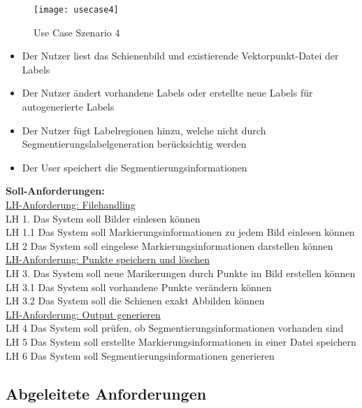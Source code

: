 \documentclass[11pt]{scrartcl}
\begin{document}
\begin{figure}[H]
  \texttt{[image: usecase4]}
  \caption{Use Case Szenario 4}
\end{figure}


\begin{itemize}
	\item Der Nutzer liest das Schienenbild und existierende Vektorpunkt-Datei der Labels
	\item Der Nutzer ändert vorhandene Labels oder erstellte neue Labels für autogenerierte Labels
	\item Der Nutzer fügt Labelregionen hinzu, welche nicht durch Segmentierungslabelgeneration berücksichtig werden
	\item Der User speichert die Segmentierungsinformationen
\end{itemize}

\noindent
\textbf{Soll-Anforderungen: } 
\\

\noindent
\underline{LH-Anforderung: Filehandling}
\\
\noindent
LH 1.    Das System soll Bilder einlesen können 
\\
\noindent
LH 1.1   Das System soll Markierungsinformationen zu jedem Bild einlesen können
\\
\noindent
LH 2 Das System soll eingelese Markierungsinformationen darstellen können
\\

\noindent
\underline{LH-Anforderung: Punkte speichern und löschen}
\\
\noindent
LH 3.    Das System soll neue Marikerungen durch Punkte im Bild erstellen können
\\
\noindent
LH 3.1 Das System soll vorhandene Punkte verändern können
\\
\noindent
LH 3.2 Das System soll die Schienen exakt Abbilden können
\\

\noindent
\underline{LH-Anforderung: Output generieren}
\\
\noindent
LH 4    Das System soll prüfen, ob Segmentierungsinformationen vorhanden sind
\\
\noindent
LH 5   Das System soll erstellte Markierungsinformationen in einer Datei speichern
\\
\noindent
LH 6  Das System soll Segmentierungsinformationen generieren
\\

\noindent
\subsection{Abgeleitete Anforderungen}
\label{sec:Abgeleitete Anforderungen}
\end{document}
